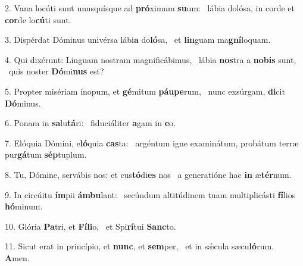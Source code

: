 2. Vana locúti sunt unusquísque ad \textbf{pró}ximum \textbf{su}um: \ast\  lábia dolósa, in corde et \textbf{cor}de lo\textbf{cú}ti sunt.\

3. Dispérdat Dóminus univérsa lábi\textbf{a} do\textbf{ló}sa, \ast\  et \textbf{lin}guam ma\textbf{gní}loquam.\

4. Qui dixérunt: Linguam nostram magnificábimus, \dag\  lábia \textbf{nos}tra a \textbf{no}\textbf{bis} sunt, \ast\  quis noster \textbf{Dó}mi\textbf{nus} est?\

5. Propter misériam ínopum, et \textbf{gé}mitum \textbf{páu}\textbf{pe}rum, \ast\  nunc exsúrgam, \textbf{di}cit \textbf{Dó}minus.\

6. Ponam in \textbf{sa}lu\textbf{tá}ri: \ast\  fiduciáliter \textbf{a}gam in \textbf{e}o.\

7. Elóquia Dómini, e\textbf{ló}quia \textbf{cas}ta: \ast\  argéntum igne examinátum, probátum terræ pur\textbf{gá}tum \textbf{sép}tuplum.\

8. Tu, Dómine, servábis nos: et cus\textbf{tó}di\textbf{es} nos \ast\  a generatióne hac \textbf{in} æ\textbf{tér}num.\

9. In circúitu \textbf{ím}pii \textbf{ám}\textbf{bu}lant: \ast\  secúndum altitúdinem tuam multiplicásti \textbf{fí}lios \textbf{hó}minum.\

10. Glória \textbf{Pa}tri, et \textbf{Fí}\textbf{li}o, \ast\  et Spi\textbf{rí}tui \textbf{Sanc}to.\

11. Sicut erat in princípio, et \textbf{nunc}, et \textbf{sem}per, \ast\  et in sǽcula sæcu\textbf{ló}rum. \textbf{A}men.\

